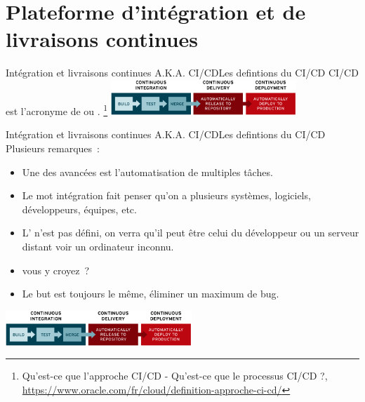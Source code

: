\documentclass{beamer}
\begin{document}
    \section{Plateforme d’intégration et de livraisons continues}\label{sec:plateforme-dintegration-et-de-livraisons-continues}

    \begin{frame}{Intégration et livraisons continues A.K.A. CI/CD}{Les defintions du CI/CD}
        \transdissolve
        CI/CD est l'acronyme de  ou .
        \bigbreak
        \footnote{Qu'est-ce que l'approche CI/CD - Qu’est-ce que le processus CI/CD ?, \url{https://www.oracle.com/fr/cloud/definition-approche-ci-cd/}}
        \bigbreak
        \centering
        \includegraphics[width=7cm]{image/ci-cd-flow}
    \end{frame}

    \begin{frame}{Intégration et livraisons continues A.K.A. CI/CD}{Les defintions du CI/CD}
        \transdissolve
        Plusieurs remarques~:
        \begin{itemize}
            \item Une des avancées est l'automatisation de multiples tâches.
            \item Le mot intégration fait penser qu'on a plusieurs systèmes, logiciels, développeurs, équipes, etc.
            \item L' n'est pas défini, on verra qu'il peut être celui du développeur ou un serveur distant voir un ordinateur inconnu.
            \item {} vous y croyez~?
            \item Le but est toujours le même, éliminer un maximum de bug.
        \end{itemize}
        \bigbreak
        \centering
        \includegraphics[width=7cm]{image/ci-cd-flow}
    \end{frame}
\end{document}
